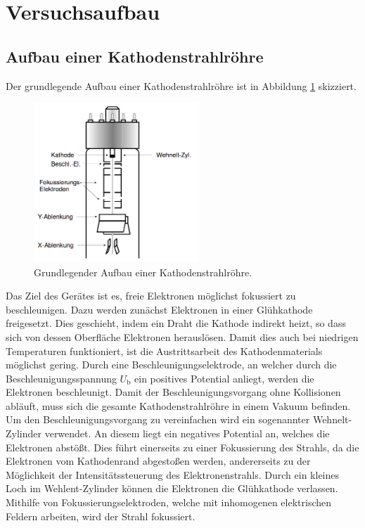\section{Versuchsaufbau}
\label{sec:Versuchsaufbau}
\subsection{Aufbau einer Kathodenstrahlröhre}

Der grundlegende Aufbau einer Kathodenstrahlröhre ist in Abbildung \ref{fig:aufbau1} skizziert.
\begin{figure}
  \centering
  \includegraphics[height=6cm]{ressources/aufbau01.png}
  \caption{Grundlegender Aufbau einer Kathodenstrahlröhre. \cite{skript1}}
  \label{fig:aufbau1}
\end{figure}
Das Ziel des Gerätes ist es, freie Elektronen möglichst fokussiert zu beschleunigen.
Dazu werden zunächst Elektronen in einer Glühkathode freigesetzt.
Dies geschieht, indem ein Draht die Kathode indirekt heizt, so dass sich von dessen Oberfläche Elektronen herauslösen.
Damit dies auch bei niedrigen Temperaturen funktioniert, ist die Austrittsarbeit des Kathodenmaterials möglichst gering.
Durch eine Beschleunigungselektrode, an welcher durch die Beschleunigungsspannung $U_\text{b}$ ein positives Potential anliegt, werden die Elektronen beschleunigt.
Damit der Beschleunigungsvorgang ohne Kollisionen abläuft, muss sich die gesamte Kathodenstrahlröhre in einem Vakuum befinden.\\
Um den Beschleunigungsvorgang zu vereinfachen wird ein sogenannter Wehnelt-Zylinder verwendet.
An diesem liegt ein negatives Potential an, welches die Elektronen abstößt.
Dies führt einerseits zu einer Fokussierung des Strahls, da die Elektronen vom Kathodenrand abgestoßen werden, andererseits zu der Möglichkeit der Intensitätssteuerung des Elektronenstrahls.
Durch ein kleines Loch im Wehlent-Zylinder können die Elektronen die Glühkathode verlassen.
Mithilfe von Fokussierungselektroden, welche mit inhomogenen elektrischen Feldern arbeiten, wird der Strahl fokussiert.
